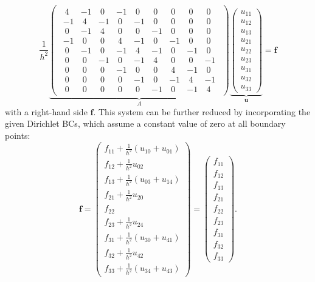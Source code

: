 \begin{equation}
\frac{1}{h^2} \underbrace{ \begin{pmatrix}
\begin{array}{ccc|ccc|ccc}~4&-1&~0&-1&~0&~0&~0&~0&~0\\-1&~4&-1&~0&-1&~0&~0&~0&~0\\~0&-1&~4&~0&~0&-1&~0&~0&~0\\\hline -1&~0&~0&~4&-1&~0&-1&~0&~0\\~0&-1&~0&-1&~4&-1&~0&-1&~0\\~0&~0&-1&~0&-1&~4&~0&~0&-1\\\hline ~0&~0&~0&-1&~0&~0&~4&-1&~0\\~0&~0&~0&~0&-1&~0&-1&~4&-1\\~0&~0&~0&~0&~0&-1&~0&-1&~4\end{array}
	\end{pmatrix}}_{\textstyle A}
\underbrace{
	\begin{pmatrix}
	u_{11} \\ u_{12} \\ u_{13} \\ u_{21} \\ u_{22} \\ u_{23} \\ u_{31} \\ u_{32} \\ u_{33}
\end{pmatrix}}_{\textstyle{\bm{u}}} = \bm f
\label{eq:2D-poisson-assembled-matrix}
\end{equation}
with a right-hand side $\bm f$. This system can be further reduced by incorporating the given Dirichlet BCs, which assume a constant value of zero at all boundary points:
\begin{equation}
\bm f = \begin{pmatrix}
		f_{11} + \frac{1}{h^2} (u_{10} + u_{01}) \\f_{12} + \frac{1}{h^2} u_{02} \\ f_{13} + \frac{1}{h^2} (u_{03} + u_{14})  \\ f_{21} + \frac{1}{h^2} u_{20} \\ f_{22} \\ f_{23} + \frac{1}{h^2} u_{24} \\ f_{31} + \frac{1}{h^2} (u_{30} + u_{41}) \\ f_{32} + \frac{1}{h^2} u_{42} \\ f_{33} + \frac{1}{h^2} (u_{34} + u_{43})
\end{pmatrix} = \begin{pmatrix}
f_{11} \\
f_{12} \\ 
f_{13} \\ 
f_{21} \\ 
f_{22} \\
f_{23} \\
f_{31} \\ 
f_{32} \\
f_{33}
\end{pmatrix}.
\label{eq:2D-poisson-assembled-rhs}
\end{equation}
